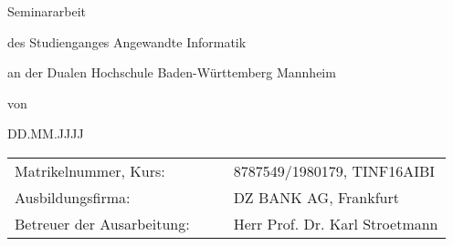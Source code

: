 	\begin{titlepage}
		
		\centering
		{\Large\bfseries \Titel \par}
		\vspace{2cm}
		Seminararbeit \par
		\vspace{3cm}
		
		des Studienganges Angewandte Informatik \par
		an der Dualen Hochschule Baden-Württemberg Mannheim \par
		\vspace{3cm}
		
		von \par
		\vspace{0.5cm}
		{\itshape \Autor \par}
		\vspace{2cm}
		DD.MM.JJJJ \par
		
		\vspace{6.5cm}
		\begin{tabular}{llll}
			Matrikelnummer, Kurs: & & & 8787549/1980179, TINF16AIBI\\
			Ausbildungsfirma: & & & DZ BANK AG, Frankfurt\\
			Betreuer der Ausarbeitung: & & & Herr Prof. Dr. Karl Stroetmann
		\end{tabular}
	\end{titlepage}